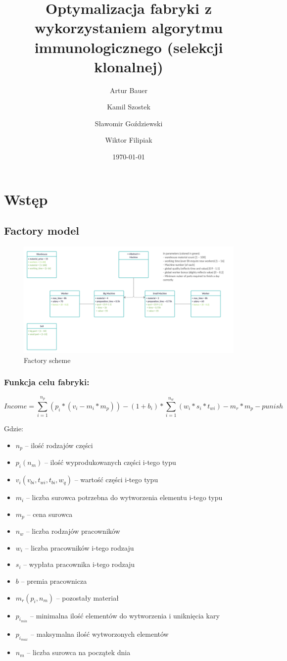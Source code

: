 \documentclass[a4paper]{article}
\title{Optymalizacja fabryki z wykorzystaniem algorytmu immunologicznego (selekcji klonalnej)}
\author{Artur Bauer \and Kamil Szostek \and Sławomir Goździewski \and Wiktor Filipiak}
\date{\today}
\begin{document}


\tableofcontents

\newpage
\section{Wstęp}
\subsection{Factory model}\label{factory}

\begin{figure}[ht]
\centering
\includegraphics[width=.7\textwidth]{Factory_scheme.png}
\caption{Factory scheme}
\end{figure}

\subsubsection{Funkcja celu fabryki:}

$$Income = \sum^{n_p}_{i=1}(p_i*(v_i-m_i*m_p)) - (1+b_i)*\sum^{n_w}_{i = 1}(w_i*s_i *t_{wi}) - m_r*m_p - punish$$

Gdzie:
\begin{itemize}
    \item $n_p$ -- ilość rodzajów części
    \item $p_i (n_m)$ -- ilość wyprodukowanych części i-tego typu
    \item $v_i(v_{bi}, t_{wi},t_{bi},w_q)$ -- wartość części i-tego typu
    \item $m_i$ -- liczba surowca potrzebna do wytworzenia elementu i-tego typu
    \item $m_p$ -- cena surowca
    \item $n_w$ -- liczba rodzajów pracowników
    \item $w_i$ -- liczba pracowników i-tego rodzaju
    \item $s_i$ -- wypłata pracownika i-tego rodzaju
    \item $b$ -- premia pracownicza
    \item $m_r(p_i,n_m)$ -- pozostały materiał
    \item $p_{i_{min}}$ -- minimalna ilość elementów do wytworzenia i uniknięcia kary
    \item $p_{i_{max}}$ -- maksymalna ilość wytworzonych elementów
    \item $n_m$ -- liczba surowca na początek dnia
\end{itemize}
\end{document}
